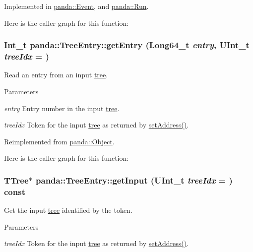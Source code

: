 Implemented in \hyperlink{classpanda_1_1Event_a714f9999480dd623a883560e62717d85}{panda::Event}, and \hyperlink{classpanda_1_1Run_a6e0400b56778094d6ac8c6c9aa8eba3a}{panda::Run}.

Here is the caller graph for this function:\hypertarget{classpanda_1_1TreeEntry_a6ac8a1bad151367648aedd366011172d}{
\subsubsection[{getEntry}]{\setlength{\rightskip}{0pt plus 5cm}Int\_\-t panda::TreeEntry::getEntry (Long64\_\-t {\em entry}, \/  UInt\_\-t {\em treeIdx} = {})}}
\label{classpanda_1_1TreeEntry_a6ac8a1bad151367648aedd366011172d}


Read an entry from an input \hyperlink{namespacepanda_1_1tree}{tree}. 
\begin{DoxyParams}{Parameters}
\item[{\em entry}]Entry number in the input \hyperlink{namespacepanda_1_1tree}{tree}. \item[{\em treeIdx}]Token for the input \hyperlink{namespacepanda_1_1tree}{tree} as returned by \hyperlink{classpanda_1_1TreeEntry_a693015be3e9d7c6daffe056798150455}{setAddress()}. \end{DoxyParams}


Reimplemented from \hyperlink{classpanda_1_1Object_a08f9b3d452bc056cf3a285dfad15e5ac}{panda::Object}.

Here is the caller graph for this function:\hypertarget{classpanda_1_1TreeEntry_a3e0841eb1ddb6e85e37413e4866101b6}{
\subsubsection[{getInput}]{\setlength{\rightskip}{0pt plus 5cm}TTree$\ast$ panda::TreeEntry::getInput (UInt\_\-t {\em treeIdx} = {}) const}}
\label{classpanda_1_1TreeEntry_a3e0841eb1ddb6e85e37413e4866101b6}


Get the input \hyperlink{namespacepanda_1_1tree}{tree} identified by the token. 
\begin{DoxyParams}{Parameters}
\item[{\em treeIdx}]Token for the input \hyperlink{namespacepanda_1_1tree}{tree} as returned by \hyperlink{classpanda_1_1TreeEntry_a693015be3e9d7c6daffe056798150455}{setAddress()}. \end{DoxyParams}


